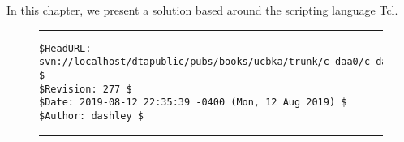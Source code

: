In this chapter, we present a solution based around the scripting language
Tcl.

\noindent\begin{figure}[!b]
\noindent\rule[-0.25in]{\textwidth}{1pt}
\begin{tiny}
\begin{verbatim}
$HeadURL: svn://localhost/dtapublic/pubs/books/ucbka/trunk/c_daa0/c_daa0.tex $
$Revision: 277 $
$Date: 2019-08-12 22:35:39 -0400 (Mon, 12 Aug 2019) $
$Author: dashley $
\end{verbatim}
\end{tiny}
\noindent\rule[0.25in]{\textwidth}{1pt}
\end{figure}
%
